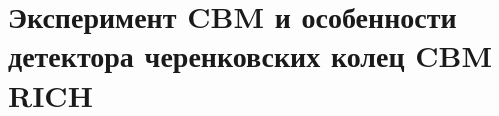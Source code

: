 \chapter{Эксперимент CBM и особенности детектора черенковских колец CBM RICH}\label{sec:secCbm}





